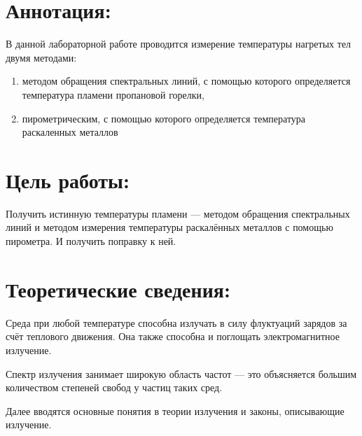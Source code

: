 \documentclass[a4paper]{article}
\begin{document}


\section*{Аннотация:}
В данной лабораторной работе проводится измерение температуры нагретых тел двумя методами:\par
\begin{enumerate} 
\item методом обращения спектральных линий, с помощью которого определяется температура пламени пропановой горелки,
\item пирометрическим, с помощью которого определяется температура раскаленных металлов
\end{enumerate}
\section*{Цель работы:}
Получить истинную температуры пламени — методом обращения спектральных линий и методом измерения температуры раскалённых металлов с помощью пирометра. И получить поправку к ней.


\vspace{4cm}





\newpage
\section*{Теоретические сведения:}


Среда при любой температуре способна излучать в силу флуктуаций зарядов за счёт теплового движения. Она также способна и поглощать электромагнитное излучение. \par
Спектр излучения занимает широкую область частот — это объясняется большим количеством степеней свобод у частиц таких сред.\par
Далее вводятся основные понятия в теории излучения и законы, описывающие излучение.\par
\end{document}
